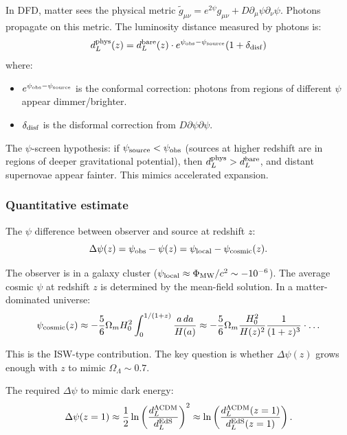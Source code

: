 \documentclass[11pt,a4paper]{article}
\begin{document}
In DFD, matter sees the physical metric $\tilde{g}_{\mu\nu} = e^{2\psi}g_{\mu\nu} + D\partial_\mu\psi\partial_\nu\psi$. Photons propagate on this metric. The luminosity distance measured by photons is:
\begin{equation}
d_L^{\rm phys}(z) = d_L^{\rm bare}(z) \cdot e^{\psi_{\rm obs} - \psi_{\rm source}}(1 + \delta_{\rm disf})
\end{equation}
where:
\begin{itemize}
\item $e^{\psi_{\rm obs} - \psi_{\rm source}}$ is the conformal correction: photons from regions of different $\psi$ appear dimmer/brighter.
\item $\delta_{\rm disf}$ is the disformal correction from $D\partial\psi\partial\psi$.
\end{itemize}

The $\psi$-screen hypothesis: if $\psi_{\rm source} < \psi_{\rm obs}$ (sources at higher redshift are in regions of deeper gravitational potential), then $d_L^{\rm phys} > d_L^{\rm bare}$, and distant supernovae appear fainter. This mimics accelerated expansion.

\subsubsection{Quantitative estimate}

The $\psi$ difference between observer and source at redshift $z$:
\begin{equation}
\Delta\psi(z) = \psi_{\rm obs} - \psi(z) = \psi_{\rm local} - \psi_{\rm cosmic}(z).
\end{equation}

The observer is in a galaxy cluster ($\psi_{\rm local} \approx \Phi_{\rm MW}/c^2 \sim -10^{-6}$). The average cosmic $\psi$ at redshift $z$ is determined by the mean-field solution. In a matter-dominated universe:
\begin{equation}
\psi_{\rm cosmic}(z) \approx -\frac{5}{6}\Omega_m H_0^2 \int_0^{1/(1+z)} \frac{a\,da}{H(a)} \approx -\frac{5}{6}\Omega_m \frac{H_0^2}{H(z)^2}\frac{1}{(1+z)^3}\cdot\ldots
\end{equation}

This is the ISW-type contribution. The key question is whether $\Delta\psi(z)$ grows enough with $z$ to mimic $\Omega_\Lambda \sim 0.7$.

The required $\Delta\psi$ to mimic dark energy:
\begin{equation}
\Delta\psi(z=1) \approx \frac{1}{2}\ln\left(\frac{d_L^{\Lambda\rm CDM}}{d_L^{\rm EdS}}\right)^2 \approx \ln\left(\frac{d_L^{\Lambda\rm CDM}(z=1)}{d_L^{\rm EdS}(z=1)}\right).
\end{equation}
\end{document}
